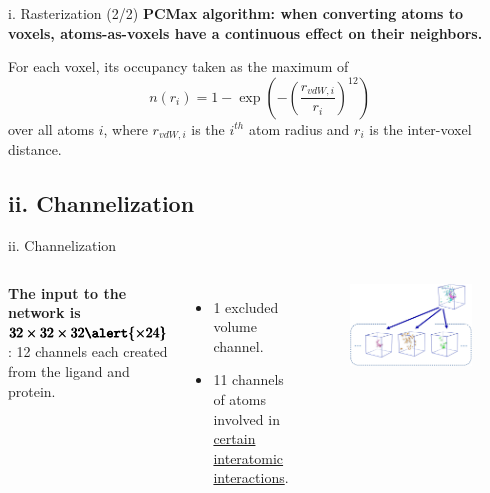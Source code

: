 \documentclass[aspectratio=169,xcolor=dvipsnames]{beamer}
\begin{document}
\begin{frame}{i. Rasterization (2/2)}
    \textbf{PCMax algorithm: when converting atoms to voxels, atoms-as-voxels
    have a continuous effect on their neighbors.}
    \vspace{3mm}

    For each voxel, its occupancy taken as the maximum of
    \begin{equation*}
        n(r_i) = 1 - \exp\left(-\left(\frac{r_{vdW, i}}{r_i}\right)^{12}\right)
    \end{equation*}
    over all atoms $i$, where $r_{vdW, i}$ is the $i^{th}$ atom radius and $r_i$ is the inter-voxel distance.
\end{frame}


\subsection{ii. Channelization}
\begin{frame}{ii. Channelization}
    \begin{columns}[c]
        \textbf{The input to the network is}
        $\pmb{32\times32\times32\alert{\times24}}$: 12 channels each
        created from the ligand and protein.
        \begin{itemize}
            \item 1 excluded volume channel.
            \item 11 channels of atoms involved in 
            \href{http://biosig.unimelb.edu.au/arpeggioweb/calculate/}
            {certain interatomic interactions}.
        \end{itemize}
        \begin{figure}
            \includegraphics[width=\textwidth]{images/grid_bottom}
        \end{figure}
    \end{columns}
\end{frame}
\end{document}

